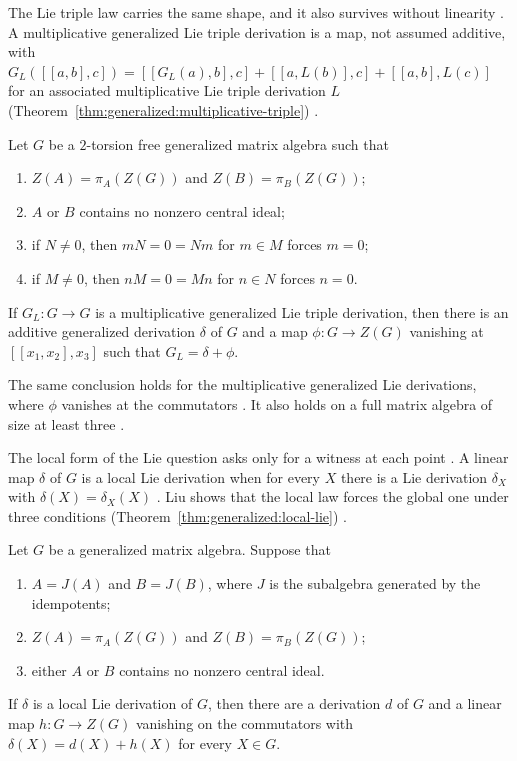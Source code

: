 The Lie triple law carries the same shape, and it also survives without
linearity \cite[Theorem~2.1, p.~3]{Jabeen2019}. A multiplicative generalized
Lie triple derivation is a map, not assumed additive, with
$G_L([[a,b],c])=[[G_L(a),b],c]+[[a,L(b)],c]+[[a,b],L(c)]$ for an associated
multiplicative Lie triple derivation $L$
(Theorem~\ref{thm:generalized:multiplicative-triple}) \cite[p.~1]{Jabeen2019}.

\begin{theorem}\label{thm:generalized:multiplicative-triple}
Let $G$ be a $2$-torsion free generalized matrix algebra such that
\begin{enumerate}
\item $Z(A)=\pi_A(Z(G))$ and $Z(B)=\pi_B(Z(G))$;
\item $A$ or $B$ contains no nonzero central ideal;
\item if $N\neq0$, then $mN=0=Nm$ for $m\in M$ forces $m=0$;
\item if $M\neq0$, then $nM=0=Mn$ for $n\in N$ forces $n=0$.
\end{enumerate}
If $G_L\colon G\to G$ is a multiplicative generalized Lie triple derivation,
then there is an additive generalized derivation $\delta$ of $G$ and a map
$\phi\colon G\to Z(G)$ vanishing at $[[x_1,x_2],x_3]$ such that
$G_L=\delta+\phi$.
\end{theorem}

The same conclusion holds for the multiplicative generalized Lie derivations,
where $\phi$ vanishes at the commutators \cite[Corollary~3.1,
p.~13]{Jabeen2019}. It also holds on a full matrix algebra of size at least
three \cite[Corollary~3.2, p.~13]{Jabeen2019}.

The local form of the Lie question asks only for a witness at each point
\cite[p.~2]{Liu2021LocalLie}. A linear map $\delta$ of $G$ is a local Lie
derivation when for every $X$ there is a Lie derivation $\delta_X$ with
$\delta(X)=\delta_X(X)$ \cite[p.~2]{Liu2021LocalLie}. Liu shows that the local
law forces the global one under three conditions
(Theorem~\ref{thm:generalized:local-lie}) \cite[Theorem~2.1,
p.~3]{Liu2021LocalLie}.

\begin{theorem}\label{thm:generalized:local-lie}
Let $G$ be a generalized matrix algebra. Suppose that
\begin{enumerate}
\item $A=J(A)$ and $B=J(B)$, where $J$ is the subalgebra generated by the
idempotents;
\item $Z(A)=\pi_A(Z(G))$ and $Z(B)=\pi_B(Z(G))$;
\item either $A$ or $B$ contains no nonzero central ideal.
\end{enumerate}
If $\delta$ is a local Lie derivation of $G$, then there are a derivation $d$ of
$G$ and a linear map $h\colon G\to Z(G)$ vanishing on the commutators with
$\delta(X)=d(X)+h(X)$ for every $X\in G$.
\end{theorem}


